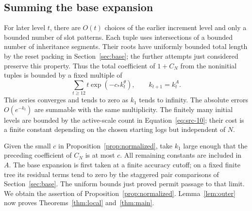 \subsection{Summing the base expansion}
For later level $t$, there are $O(t)$ choices of the earlier increment
level and only a bounded number of slot patterns.  Each tuple uses
intersections of a bounded number of inheritance segments.  Their roots
have uniformly bounded total length by the reset packing in
Section~\ref{sec:base}; the further attempts just considered preserve
this property.  Thus the total coefficient of $1+C_N$ from the
noninitial tuples is bounded by a fixed multiple of
\[
 \sum_{t\ge12}t\exp(-c_*k_t^\theta),
 \qquad k_{t+1}=k_t^A.
\]
This series converges and tends to zero as $k_1$ tends to infinity.
The absolute errors $O(e^{-k_t})$ are summable with the same multiplicity.
The finitely many initial levels are bounded by the active-scale count
in Equation~\eqref{eq:src-10}; their cost is a finite constant depending
on the chosen starting logs but independent of $N$.

Given the small $c$ in Proposition~\ref{prop:normalized}, take $k_1$
large enough that the preceding coefficient of $C_N$ is at most $c$.
All remaining constants are included in $A$.  The base expansion is
first taken at a finite accuracy cutoff; on a fixed finite tree its
residual terms tend to zero by the staggered pair comparisons of
Section~\ref{sec:base}.  The uniform bounds just proved permit passage
to that limit.  We obtain the assertion of
Proposition~\ref{prop:normalized}.
Lemma~\ref{lem:outer} now proves Theorems~\ref{thm:local}
and~\ref{thm:main}.
